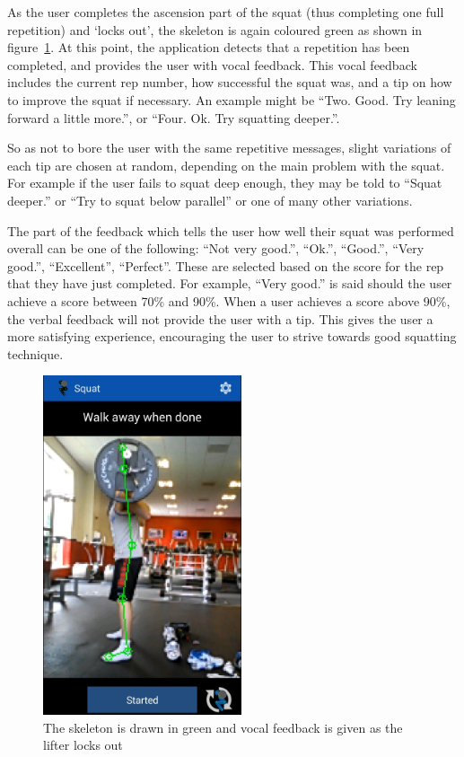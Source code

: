 As the user completes the ascension part of the squat (thus completing one full repetition) and `locks out', the skeleton is again coloured green as shown in figure~\ref{fig:lockout}. At this point, the application detects that a repetition has been completed, and provides the user with vocal feedback. This vocal feedback includes the current rep number, how successful the squat was, and a tip on how to improve the squat if necessary. An example might be ``Two. Good. Try leaning forward a little more.'', or ``Four. Ok. Try squatting deeper.''.

So as not to bore the user with the same repetitive messages, slight variations of each tip are chosen at random, depending on the main problem with the squat. For example if the user fails to squat deep enough, they may be told to ``Squat deeper.'' or ``Try to squat below parallel'' or one of many other variations.

The part of the feedback which tells the user how well their squat was performed overall can be one of the following: ``Not very good.'', ``Ok.'', ``Good.'', ``Very good.'', ``Excellent'', ``Perfect''. These are selected based on the score for the rep that they have just completed. For example, ``Very good.'' is said should the user achieve a score between 70\% and 90\%. When a user achieves a score above 90\%, the verbal feedback will not provide the user with a tip. This gives the user a more satisfying experience, encouraging the user to strive towards good squatting technique.

\begin{figure}[H]
    \centering
	\includegraphics[height=10cm]{application/images/lockout}
\caption{The skeleton is drawn in green and vocal feedback is given as the lifter locks out}
\label{fig:lockout}
\end{figure}

